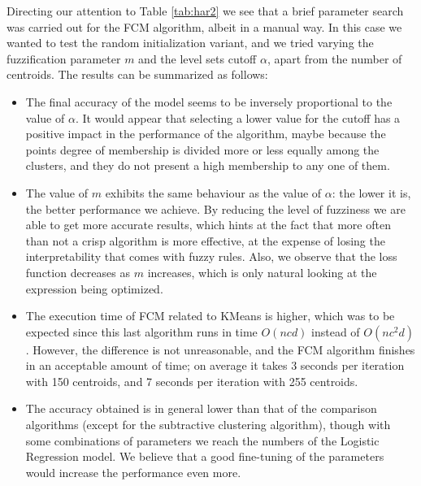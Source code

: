 Directing our attention to Table \ref{tab:har2} we see that a brief parameter search was carried out for the FCM algorithm, albeit in a manual way. In this case  we wanted to test the random initialization variant, and we tried varying the fuzzification parameter $m$ and the level sets cutoff $\alpha$, apart from the number of centroids. The results can be summarized as follows:

\begin{itemize}
  \item The final accuracy of the model seems to be inversely proportional to the value of $\alpha$. It would appear that selecting a lower value for the cutoff has a positive impact in the performance of the algorithm, maybe because the points degree of membership is divided more or less equally among the clusters, and they do not present a high membership to any one of them.
  \item The value of $m$ exhibits the same behaviour as the value of $\alpha$: the lower it is, the better performance we achieve. By reducing the level of fuzziness we are able to get more accurate results, which hints at the fact that more often than not a crisp algorithm is more effective, at the expense of losing the interpretability that comes with fuzzy rules. Also, we observe that the loss function decreases as $m$ increases, which is only natural looking at the expression being optimized.
  \item The execution time of FCM related to KMeans is higher, which was to be expected since this last algorithm runs in time $O(ncd)$ instead of $O(nc^2d)$. However, the difference is not unreasonable, and the FCM algorithm finishes in an acceptable amount of time; on average it takes 3 seconds per iteration with 150 centroids, and 7 seconds per iteration with 255 centroids.
  \item The accuracy obtained is in general lower than that of the comparison algorithms (except for the subtractive clustering algorithm), though with some combinations of parameters we reach the numbers of the Logistic Regression model. We believe that a good fine-tuning of the parameters would increase the performance even more.
\end{itemize}

